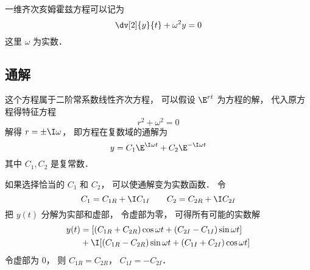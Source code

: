
\begin{issues}
\issueNeedCite
{}
\end{issues}


一维齐次亥姆霍兹方程可以记为
\begin{equation}
\dv[2]{y}{t} + \omega^2 y = 0
\end{equation}
这里 $\omega$ 为实数．

\subsection{通解}
这个方程属于二阶常系数线性齐次方程， 可以假设 $\E^{rt}$ 为方程的解， 代入原方程得特征方程
\begin{equation}
r^2 + \omega^2 = 0
\end{equation}
解得 $r = \pm \I \omega$， 即方程在复数域的通解为
\begin{equation}
y = C_1 \E^{\I\omega t} + C_2 \E^{-\I\omega t}
\end{equation}
其中 $C_1, C_2$ 是复常数．

如果选择恰当的 $C_1$ 和 $C_2$， 可以使通解变为实数函数． 令
\begin{equation}
C_1 = C_{1R} + \I C_{1I} \qquad
C_2 = C_{2R} + \I C_{2I}
\end{equation}
把 $y(t)$ 分解为实部和虚部， 令虚部为零， 可得所有可能的实数解
\begin{equation}
\begin{aligned}
y(t) &= [(C_{1R} + C_{2R}) \cos\omega t + (C_{2I} - C_{1I}) \sin\omega t] \\
& + \I [(C_{1R} - C_{2R}) \sin \omega t + (C_{1I} + C_{2I}) \cos \omega t]
\end{aligned}
\end{equation}
令虚部为 $0$， 则 $C_{1R} = C_{2R}$， $C_{1I} = -C_{2I}$．
